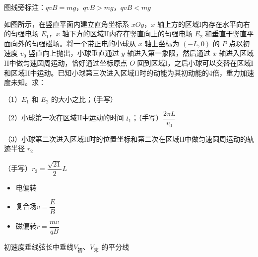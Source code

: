 图线旁标注：$qvB=mg$，$qvB>mg$，$qvB<mg$
\begin{problem}[（20分）]
如图所示，在竖直平面内建立直角坐标系 $xOy$，$x$ 轴上方的区域I内存在水平向右的匀强电场 $E_1$，$x$ 轴下方的区域II内存在竖直向上的匀强电场 $E_2$ 和垂直于竖直平面向外的匀强磁场。将一个带正电的小球从 $x$ 轴上坐标为 $(-L,0)$ 的 $P$ 点以初速度 $v_0$ 竖直向上抛出，小球垂直通过 $y$ 轴进入第一象限，然后通过 $x$ 轴进入区域II中做匀速圆周运动，恰好通过坐标原点 $O$ 回到区域I，之后小球可以交替在区域I和区域II中运动。已知小球第三次进入区域II时的动能为其初动能的4倍，重力加速度未知。求：

（1）$E_1$ 和 $E_2$ 的大小之比；\quad （手写）%

（2）小球第一次在区域II中运动的时间 $t_1$；\quad （手写）$\dfrac{2\pi L}{v_0}$

（3）小球第二次进入区域II时的位置坐标和第二次在区域II中做匀速圆周运动的轨迹半径 $r_2$

（手写）$r_2=\dfrac{\sqrt{21}}{2}L$

\end{problem}
\begin{itemize}
\item 电偏转\ 
\item 复合场\quad $v=\dfrac{E}{B}$
\item 磁偏转\quad $r=\dfrac{mv}{qB}$
\end{itemize}
初速度垂线\quad 弦长中垂线\quad $V_{\text{初}}$、$V_{\text{末}}$ 的平分线\quad {}

